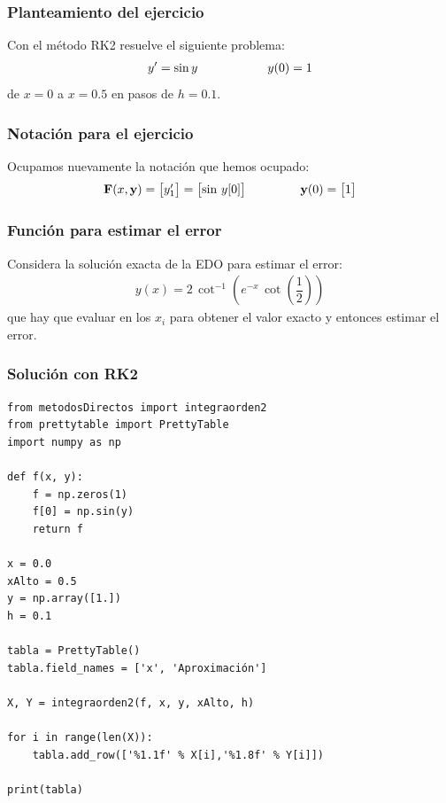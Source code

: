 \documentclass[12pt]{beamer}
\begin{document}
\begin{frame}
\frametitle{Planteamiento del ejercicio}
Con el método RK2 resuelve el siguiente problema:
\pause
\begin{align*}
{y}^{\prime} = \sin y \hspace{2cm} y(0) = 1
\end{align*}
de $x = 0$ a $x = 0.5$ en pasos de $h = 0.1$.
\end{frame}
\begin{frame}
\frametitle{Notación para el ejercicio}
Ocupamos nuevamente la notación que hemos ocupado:
\begin{align*}
\mathbf{F} (x, \mathbf{y}) = 
\begin{bmatrix}
{y}^{\prime}_{1}
\end{bmatrix} =
\begin{bmatrix}
\sin \, y[0]
\end{bmatrix}
\hspace{1.5cm}
\mathbf{y} (0) = 
\begin{bmatrix}
1
\end{bmatrix}
\end{align*}
\end{frame}
\begin{frame}
\frametitle{Función para estimar el error}
Considera la solución exacta de la EDO para estimar el error:
\pause
\begin{align*}
y (x) = 2 \, \cot^{-1} \left( e^{-x} \, \cot \left(\dfrac{1}{2} \right) \right)
\end{align*}
que hay que evaluar en los $x_{i}$ para obtener el valor exacto y entonces estimar el error.
\end{frame}
\begin{frame}
\frametitle{Solución con RK2}
\begin{lstlisting}[caption=Código para resolver con RK2 el ejercicio]
from metodosDirectos import integraorden2
from prettytable import PrettyTable
import numpy as np

def f(x, y):
	f = np.zeros(1)
	f[0] = np.sin(y)
	return f

x = 0.0
xAlto = 0.5
y = np.array([1.])
h = 0.1

tabla = PrettyTable()
tabla.field_names = ['x', 'Aproximación']

X, Y = integraorden2(f, x, y, xAlto, h)

for i in range(len(X)):
	tabla.add_row(['%1.1f' % X[i],'%1.8f' % Y[i]])

print(tabla)
\end{lstlisting}
\end{frame}
\end{document}
